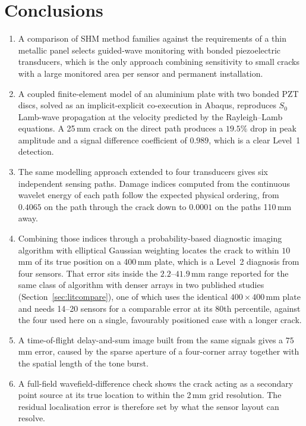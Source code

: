 \section{Conclusions}

\begin{enumerate}[leftmargin=*,itemsep=3pt]
  \item A comparison of SHM method families against the requirements of a thin metallic panel selects
  guided-wave monitoring with bonded piezoelectric transducers, which is the only approach combining
  sensitivity to small cracks with a large monitored area per sensor and permanent installation.

  \item A coupled finite-element model of an aluminium plate with two bonded PZT discs, solved as an
  implicit-explicit co-execution in Abaqus, reproduces $S_{0}$ Lamb-wave propagation at the velocity
  predicted by the Rayleigh--Lamb equations. A 25\,mm crack on the direct path produces a $19.5\%$ drop in
  peak amplitude and a signal difference coefficient of $0.989$, which is a clear Level~1 detection.

  \item The same modelling approach extended to four transducers gives six independent sensing paths.
  Damage indices computed from the continuous wavelet energy of each path follow the expected physical
  ordering, from $0.4065$ on the path through the crack down to $0.0001$ on the paths 110\,mm away.

  \item Combining those indices through a probability-based diagnostic imaging algorithm with elliptical
  Gaussian weighting locates the crack to within $10$\,mm of its true position on a 400\,mm plate, which is
  a Level~2 diagnosis from four sensors. That error sits inside the $2.2$--$41.9$\,mm range reported for the
  same class of algorithm with denser arrays in two published studies (Section~\ref{sec:litcompare}), one of
  which uses the identical $400\times400$\,mm plate and needs 14--20 sensors for a comparable error at its
  80th percentile, against the four used here on a single, favourably positioned case with a longer crack.

  \item A time-of-flight delay-and-sum image built from the same signals gives a $75$\,mm error, caused by
  the sparse aperture of a four-corner array together with the spatial length of the tone burst.

  \item A full-field wavefield-difference check shows the crack acting as a secondary point source at its
  true location to within the 2\,mm grid resolution. The residual localisation error is therefore set by what
  the sensor layout can resolve.
\end{enumerate}

